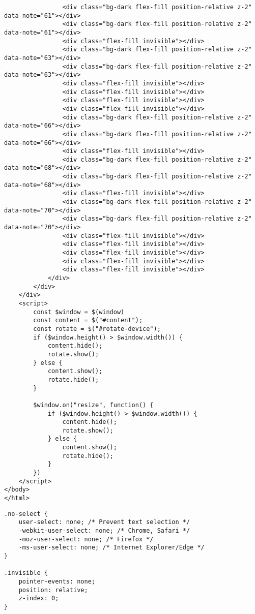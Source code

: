 \documentclass[../main.tex]{subfiles}
\begin{document}
\begin{verbatim}
                <div class="bg-dark flex-fill position-relative z-2" data-note="61"></div>
                <div class="bg-dark flex-fill position-relative z-2" data-note="61"></div>
                <div class="flex-fill invisible"></div>
                <div class="bg-dark flex-fill position-relative z-2" data-note="63"></div>
                <div class="bg-dark flex-fill position-relative z-2" data-note="63"></div>
                <div class="flex-fill invisible"></div>
                <div class="flex-fill invisible"></div>
                <div class="flex-fill invisible"></div>
                <div class="flex-fill invisible"></div>
                <div class="bg-dark flex-fill position-relative z-2" data-note="66"></div>
                <div class="bg-dark flex-fill position-relative z-2" data-note="66"></div>
                <div class="flex-fill invisible"></div>
                <div class="bg-dark flex-fill position-relative z-2" data-note="68"></div>
                <div class="bg-dark flex-fill position-relative z-2" data-note="68"></div>
                <div class="flex-fill invisible"></div>
                <div class="bg-dark flex-fill position-relative z-2" data-note="70"></div>
                <div class="bg-dark flex-fill position-relative z-2" data-note="70"></div>
                <div class="flex-fill invisible"></div>
                <div class="flex-fill invisible"></div>
                <div class="flex-fill invisible"></div>
                <div class="flex-fill invisible"></div>
                <div class="flex-fill invisible"></div>
            </div>
        </div>
    </div>
    <script>
        const $window = $(window)
        const content = $("#content");
        const rotate = $("#rotate-device");
        if ($window.height() > $window.width()) {
            content.hide();
            rotate.show();
        } else {
            content.show();
            rotate.hide();
        }

        $window.on("resize", function() {
            if ($window.height() > $window.width()) {
                content.hide();
                rotate.show();
            } else {
                content.show();
                rotate.hide();
            }
        })
    </script>
</body>
</html>
\end{verbatim}

\begin{verbatim}
.no-select {
    user-select: none; /* Prevent text selection */
    -webkit-user-select: none; /* Chrome, Safari */
    -moz-user-select: none; /* Firefox */
    -ms-user-select: none; /* Internet Explorer/Edge */
}

.invisible {
    pointer-events: none;
    position: relative;
    z-index: 0;
}
\end{verbatim}
\end{document}
